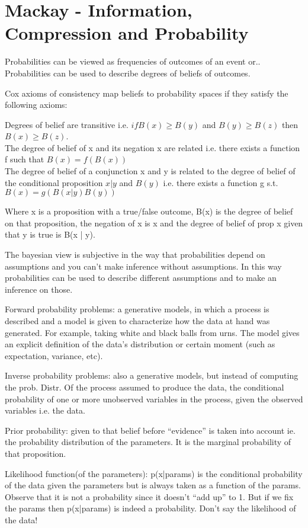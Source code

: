 \section{Mackay - Information, Compression and Probability}

Probabilities can be viewed  as frequencies of outcomes of an event or..\\
Probabilities can be used to describe degrees of beliefs of outcomes.

Cox axioms of consistency map beliefs to probability spaces if they satisfy the following axioms:

Degrees of belief are transitive i.e. $if B(x) \geq B(y)$ and $B(y) \geq B(z)$ then $B(x) \geq B(z)$. \\
The degree of belief of x and its negation x are related i.e. there exists a function f such that $B(x) = f(B(x))$ \\
The degree of belief of a conjunction x and y is related to the degree of belief of the conditional proposition $x | y$ and $B(y)$ i.e. there exists a function g s.t. $B(x) = g(B(x | y)B(y))$

Where x is a proposition with a true/false outcome, B(x) is the degree of belief on that proposition, the negation of x is x and the degree of belief of prop x given that y is true is B(x | y).

The bayesian view is subjective in the way that  probabilities depend on assumptions and you can’t make inference without assumptions.
In this way probabilities can be used to describe different assumptions and to make an inference on those. 

Forward probability problems: a generative models, in which a process is described and a model is given to characterize how the data at hand was generated. For example, taking white and black balls from urns. The model gives an explicit definition of the data’s distribution or certain moment (such as expectation, variance, etc).

Inverse probability problems: also a generative models, but instead of computing the prob. Distr. Of the process assumed to produce the data, the conditional probability of one or more unobserved variables in the process, given the observed variables i.e. the data.

Prior probability: given to that belief before “evidence” is taken into account ie. the probability distribution of the parameters. It is the marginal probability of that proposition. 

Likelihood function(of the parameters): p(x|params) is the conditional probability of the data given the parameters but is always taken as a function of the params. Observe that it is not a probability since it doesn't “add up” to 1. But if we fix the params then p(x|params) is indeed a probability. 
Don’t say the likelihood of the data!

